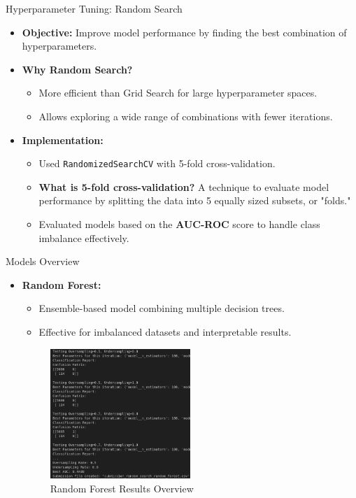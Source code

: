 \documentclass{beamer}
\begin{document}
\begin{frame}{Hyperparameter Tuning: Random Search}
    \begin{itemize}
        \item \textbf{Objective:} Improve model performance by finding the best combination of hyperparameters.
        \item \textbf{Why Random Search?}
        \begin{itemize}
            \item More efficient than Grid Search for large hyperparameter spaces.
            \item Allows exploring a wide range of combinations with fewer iterations.
        \end{itemize}
        \item \textbf{Implementation:}
        \begin{itemize}
            \item Used \texttt{RandomizedSearchCV} with 5-fold cross-validation.
            \item \textbf{What is 5-fold cross-validation?} A technique to evaluate model performance by splitting the data into 5 equally sized subsets, or "folds."
            \item Evaluated models based on the \textbf{AUC-ROC} score to handle class imbalance effectively.
        \end{itemize}
    \end{itemize}
\end{frame}

\begin{frame}{Models Overview}
    \begin{itemize}
        \item \textbf{Random Forest:}
        \begin{itemize}
            \item Ensemble-based model combining multiple decision trees.
            \item Effective for imbalanced datasets and interpretable results.
        \end{itemize}
    \begin{figure}
        \centering
        \includegraphics[width=0.5\textwidth]{images/rf.png} %
        \caption{Random Forest Results Overview}
    \end{figure}

    \end{itemize}
\end{frame}
\end{document}
